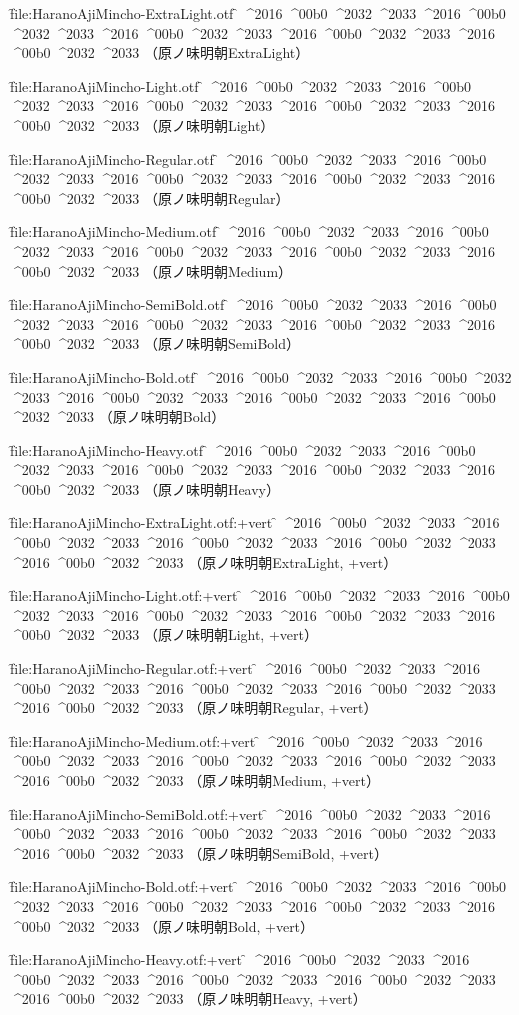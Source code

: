 

\nopagenumbers

\def\test{%
^^^^2016%
^^^^00b0%
^^^^2032%
^^^^2033}

\def\testAll{\test \test \test \test \test}


\font\f{file:HaranoAjiMincho-ExtraLight.otf} \f
\testAll
（原ノ味明朝ExtraLight）\par

\font\f{file:HaranoAjiMincho-Light.otf} \f
\testAll
（原ノ味明朝Light）\par

\font\f{file:HaranoAjiMincho-Regular.otf} \f
\testAll
（原ノ味明朝Regular）\par

\font\f{file:HaranoAjiMincho-Medium.otf} \f
\testAll
（原ノ味明朝Medium）\par

\font\f{file:HaranoAjiMincho-SemiBold.otf} \f
\testAll
（原ノ味明朝SemiBold）\par

\font\f{file:HaranoAjiMincho-Bold.otf} \f
\testAll
（原ノ味明朝Bold）\par

\font\f{file:HaranoAjiMincho-Heavy.otf} \f
\testAll
（原ノ味明朝Heavy）\par


\font\f{file:HaranoAjiMincho-ExtraLight.otf:+vert} \f
\testAll
（原ノ味明朝ExtraLight, +vert）\par

\font\f{file:HaranoAjiMincho-Light.otf:+vert} \f
\testAll
（原ノ味明朝Light, +vert）\par

\font\f{file:HaranoAjiMincho-Regular.otf:+vert} \f
\testAll
（原ノ味明朝Regular, +vert）\par

\font\f{file:HaranoAjiMincho-Medium.otf:+vert} \f
\testAll
（原ノ味明朝Medium, +vert）\par

\font\f{file:HaranoAjiMincho-SemiBold.otf:+vert} \f
\testAll
（原ノ味明朝SemiBold, +vert）\par

\font\f{file:HaranoAjiMincho-Bold.otf:+vert} \f
\testAll
（原ノ味明朝Bold, +vert）\par

\font\f{file:HaranoAjiMincho-Heavy.otf:+vert} \f
\testAll
（原ノ味明朝Heavy, +vert）\par


